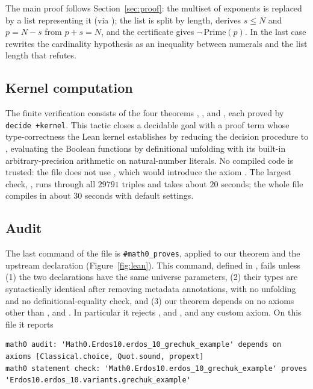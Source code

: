 \documentclass[11pt]{amsart}
\theoremstyle{plain}
\theoremstyle{definition}
\begin{document}
The main proof follows Section~\ref{sec:proof}: the multiset of exponents is replaced by a list representing it (via ); the list is split by length,  derives $s\le N$ and $p=N-s$ from $p+s=N$, and the certificate gives $\neg\,\mathrm{Prime}(p)$. In the last case  rewrites the cardinality hypothesis as an inequality between numerals and the list length that  refutes.

\subsection*{Kernel computation}
The finite verification consists of the four theorems , ,  and , each proved by \texttt{decide +kernel}. This tactic closes a decidable goal with a proof term whose type-correctness the Lean kernel establishes by reducing the decision procedure to , evaluating the Boolean functions by definitional unfolding with its built-in arbitrary-precision arithmetic on natural-number literals. No compiled code is trusted: the file does not use , which would introduce the axiom . The largest check, , runs through all $29791$ triples and takes about $20$ seconds; the whole file compiles in about $30$ seconds with default settings.

\subsection*{Audit}
The last command of the file is \texttt{\#math0\_proves}, applied to our theorem and the upstream declaration (Figure~\ref{fig:lean}). This command, defined in , fails unless (1) the two declarations have the same universe parameters, (2) their types are syntactically identical after removing metadata annotations, with no unfolding and no definitional-equality check, and (3) our theorem depends on no axioms other than ,  and . In particular it rejects ,  and , and any custom axiom. On this file it reports
\begin{lstlisting}
math0 audit: 'Math0.Erdos10.erdos_10_grechuk_example' depends on axioms [Classical.choice, Quot.sound, propext]
math0 statement check: 'Math0.Erdos10.erdos_10_grechuk_example' proves 'Erdos10.erdos_10.variants.grechuk_example'
\end{lstlisting}
\end{document}
